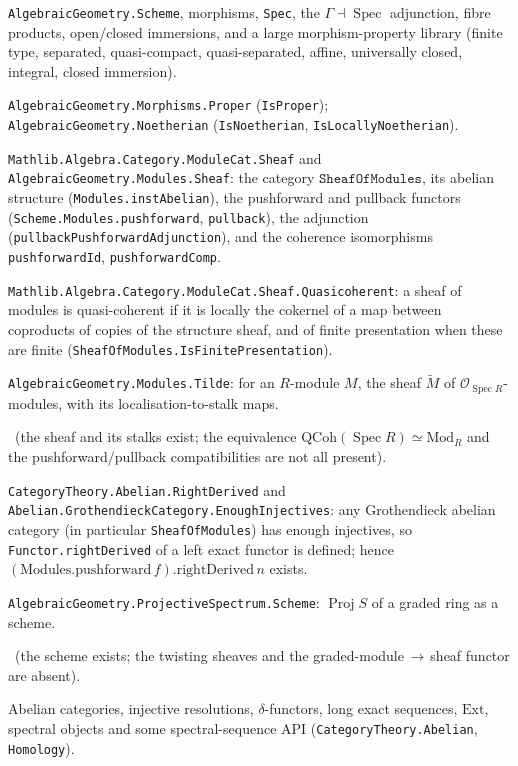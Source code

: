 \documentclass[11pt]{report}
\providecommand{\mathlibok}{\par\noindent{\footnotesize\textcolor{gray}{[in Mathlib today, modulo API glue]}}}
\providecommand{\mathlibpartial}{\par\noindent{\footnotesize\textcolor{gray}{[partly in Mathlib: must be extended]}}}
\theoremstyle{plain}
\theoremstyle{definition}
\newcommand{\Spec}{\operatorname{Spec}}
\newcommand{\Proj}{\operatorname{Proj}}
\newcommand{\Oo}{\mathcal{O}}
\begin{document}
\begin{description}[leftmargin=1.4em]
\item[Schemes.] \texttt{AlgebraicGeometry.Scheme}, morphisms, \texttt{Spec},
the $\Gamma\!\dashv\!\Spec$ adjunction, fibre products, open/closed
immersions, and a large morphism-property library (finite type, separated,
quasi-compact, quasi-separated, affine, universally closed, integral, closed
immersion). \mathlibok
\item[Proper and Noetherian.] \texttt{AlgebraicGeometry.Morphisms.Proper}
(\texttt{IsProper}); \texttt{AlgebraicGeometry.Noetherian}
(\texttt{IsNoetherian}, \texttt{IsLocallyNoetherian}). \mathlibok
\item[Sheaves of modules.]
\texttt{Mathlib.Algebra.Category.ModuleCat.Sheaf} and
\texttt{AlgebraicGeometry.Modules.Sheaf}: the category
$\texttt{SheafOfModules}$, its abelian structure
(\texttt{Modules.instAbelian}), the pushforward and pullback functors
(\texttt{Scheme.Modules.pushforward}, \texttt{pullback}), the adjunction
(\texttt{pullbackPushforwardAdjunction}), and the coherence isomorphisms
\texttt{pushforwardId}, \texttt{pushforwardComp}. \mathlibok
\item[Quasi-coherence, abstractly.]
\texttt{Mathlib.Algebra.Category.ModuleCat.Sheaf.Quasicoherent}: a sheaf of
modules is quasi-coherent if it is locally the cokernel of a map between
coproducts of copies of the structure sheaf, and of finite presentation when
these are finite (\texttt{SheafOfModules.IsFinitePresentation}). \mathlibok
\item[The affine model $\widetilde M$.]
\texttt{AlgebraicGeometry.Modules.Tilde}: for an $R$-module $M$, the sheaf
$\widetilde M$ of $\Oo_{\Spec R}$-modules, with its localisation-to-stalk
maps. \mathlibpartial\ (the sheaf and its stalks exist; the equivalence
$\mathrm{QCoh}(\Spec R)\simeq \mathrm{Mod}_R$ and the pushforward/pullback
compatibilities are not all present).
\item[Derived functors.]
\texttt{CategoryTheory.Abelian.RightDerived} and
\texttt{Abelian.GrothendieckCategory.EnoughInjectives}: any Grothendieck
abelian category (in particular \texttt{SheafOfModules}) has enough
injectives, so \texttt{Functor.rightDerived} of a left exact functor is
defined; hence
$(\mathrm{Modules.pushforward}\,f).\mathrm{rightDerived}\,n$ exists. \mathlibok
\item[Proj.] \texttt{AlgebraicGeometry.ProjectiveSpectrum.Scheme}: $\Proj S$
of a graded ring as a scheme. \mathlibpartial\ (the scheme exists; the
twisting sheaves and the graded-module$\,\to\,$sheaf functor are absent).
\item[Homological algebra.] Abelian categories, injective resolutions,
$\delta$-functors, long exact sequences, $\mathrm{Ext}$, spectral objects and
some spectral-sequence API (\texttt{CategoryTheory.Abelian},
\texttt{Homology}). \mathlibok
\end{description}
\end{document}
